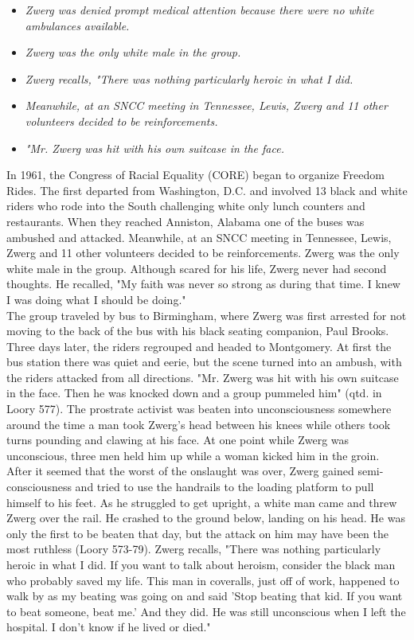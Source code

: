 \begin{itemize}
\item
  \emph{Zwerg was denied prompt medical attention because there were no
  white ambulances available.}
\item
  \emph{Zwerg was the only white male in the group.}
\item
  \emph{Zwerg recalls, "There was nothing particularly heroic in what I
  did.}
\item
  \emph{Meanwhile, at an SNCC meeting in Tennessee, Lewis, Zwerg and 11
  other volunteers decided to be reinforcements.}
\item
  \emph{"Mr. Zwerg was hit with his own suitcase in the face.}
\end{itemize}

In 1961, the Congress of Racial Equality (CORE) began to organize
Freedom Rides. The first departed from Washington, D.C. and involved 13
black and white riders who rode into the South challenging white only
lunch counters and restaurants. When they reached Anniston, Alabama one
of the buses was ambushed and attacked. Meanwhile, at an SNCC meeting in
Tennessee, Lewis, Zwerg and 11 other volunteers decided to be
reinforcements. Zwerg was the only white male in the group. Although
scared for his life, Zwerg never had second thoughts. He recalled, "My
faith was never so strong as during that time. I knew I was doing what I
should be doing."\\
The group traveled by bus to Birmingham, where Zwerg was first arrested
for not moving to the back of the bus with his black seating companion,
Paul Brooks. Three days later, the riders regrouped and headed to
Montgomery. At first the bus station there was quiet and eerie, but the
scene turned into an ambush, with the riders attacked from all
directions. "Mr. Zwerg was hit with his own suitcase in the face. Then
he was knocked down and a group pummeled him" (qtd. in Loory 577). The
prostrate activist was beaten into unconsciousness somewhere around the
time a man took Zwerg's head between his knees while others took turns
pounding and clawing at his face. At one point while Zwerg was
unconscious, three men held him up while a woman kicked him in the
groin. After it seemed that the worst of the onslaught was over, Zwerg
gained semi-consciousness and tried to use the handrails to the loading
platform to pull himself to his feet. As he struggled to get upright, a
white man came and threw Zwerg over the rail. He crashed to the ground
below, landing on his head. He was only the first to be beaten that day,
but the attack on him may have been the most ruthless (Loory 573-79).
Zwerg recalls, "There was nothing particularly heroic in what I did. If
you want to talk about heroism, consider the black man who probably
saved my life. This man in coveralls, just off of work, happened to walk
by as my beating was going on and said 'Stop beating that kid. If you
want to beat someone, beat me.' And they did. He was still unconscious
when I left the hospital. I don't know if he lived or died."

